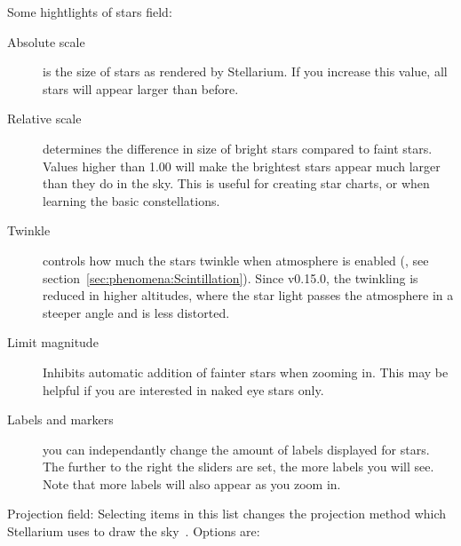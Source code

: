 \newpage
Some hightlights of stars field:
\begin{description}
\item[Absolute scale] is the size of stars as rendered by
  Stellarium. If you increase this value, all stars will appear larger
  than before.
\item[Relative scale] determines the difference in size of bright
  stars compared to faint stars. Values higher than 1.00 will make the
  brightest stars appear much larger than they do in the sky. This is
  useful for creating star charts, or when learning the basic
  constellations.
\item[Twinkle] controls how much the stars twinkle when atmosphere is
  enabled (, see section~\ref{sec:phenomena:Scintillation}). 
  Since v0.15.0, the twinkling is reduced in higher altitudes,
  where the star light passes the atmosphere in a steeper angle and is
  less distorted.
\item[Limit magnitude] Inhibits automatic addition of fainter stars
  when zooming in. This may be helpful if you are interested in naked
  eye stars only.
\item[Labels and markers] you can independantly change the amount of
  labels displayed for stars. The further to the
  right the sliders are set, the more labels you will see. Note that
  more labels will also appear as you zoom in.
\end{description}

Projection field: Selecting items in this list changes the
  projection method which Stellarium uses to draw the sky~\citep{Snyder:MapProjections}. Options are:

